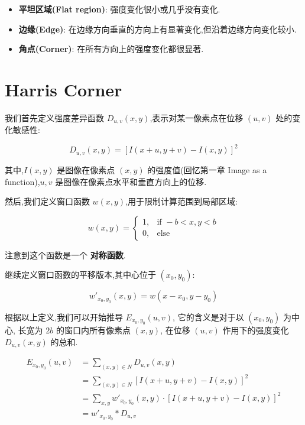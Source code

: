 \begin{itemize}
    \item \textbf{平坦区域(Flat region)}: 强度变化很小或几乎没有变化.
    \item \textbf{边缘(Edge)}: 在边缘方向垂直的方向上有显著变化,但沿着边缘方向变化较小.
    \item \textbf{角点(Corner)}: 在所有方向上的强度变化都很显著.
\end{itemize}

\section{Harris Corner}

我们首先定义强度差异函数 $D_{u,v}(x, y)$,表示对某一像素点在位移 $(u, v)$ 处的变化敏感性:

$$
D_{u,v}(x, y) = \left[I(x + u, y + v) - I(x, y)\right]^2
$$

其中,$I(x, y)$ 是图像在像素点 $(x, y)$ 的强度值(回忆第一章 Image as a function),$u, v$ 是图像在像素点水平和垂直方向上的位移.

然后,我们定义窗口函数 $w(x, y)$,用于限制计算范围到局部区域:

\begin{equation}
    w(x, y) =
    \begin{cases}
        1, & \text{if } -b < x, y < b \\
        0, & \text{else}
    \end{cases}
\end{equation}

注意到这个函数是一个 \textbf{对称函数}.

继续定义窗口函数的平移版本,其中心位于 $(x_0, y_0)$:

\begin{equation}
    w'_{x_0, y_0}(x, y) = w(x - x_0, y - y_0)
\end{equation}

根据以上定义,我们可以开始推导 $E_{x_0, y_0}(u, v)$, 它的含义是对于以 $(x_0, y_0)$ 为中心, 长宽为 $2b$ 的窗口内所有像素点 $(x, y)$, 在位移 $(u, v)$ 作用下的强度变化 $D_{u,v}(x, y)$ 的总和.

\begin{equation}
\begin{aligned}
E_{x_0, y_0}(u, v) &= \sum_{(x, y) \in N} D_{u,v}(x, y) \\
&= \sum_{(x, y) \in N} \left[I(x + u, y + v) - I(x, y)\right]^2 \\
&= \sum_{x, y} w'_{x_0, y_0}(x, y) \cdot \left[I(x + u, y + v) - I(x, y)\right]^2 \\
&= w'_{x_0, y_0} * D_{u,v}
\end{aligned}
\end{equation}

